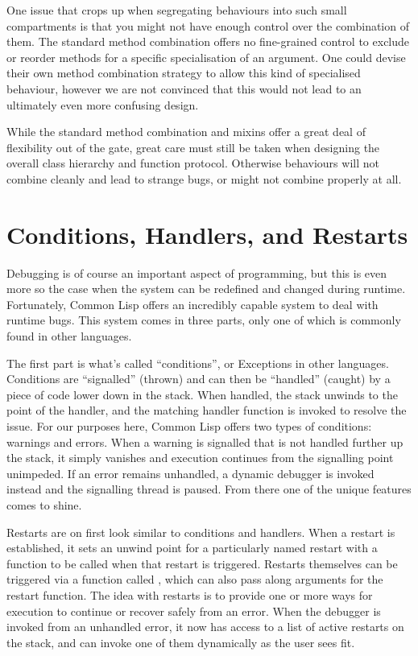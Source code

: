 \documentclass[a4paper]{paper}
\begin{document}
One issue that crops up when segregating behaviours into such small compartments is that you might not have enough control over the combination of them. The standard method combination offers no fine-grained control to exclude or reorder methods for a specific specialisation of an argument. One could devise their own method combination strategy to allow this kind of specialised behaviour, however we are not convinced that this would not lead to an ultimately even more confusing design.

While the standard method combination and mixins offer a great deal of flexibility out of the gate, great care must still be taken when designing the overall class hierarchy and function protocol. Otherwise behaviours will not combine cleanly and lead to strange bugs, or might not combine properly at all.

\section{Conditions, Handlers, and Restarts}
Debugging is of course an important aspect of programming, but this is even more so the case when the system can be redefined and changed during runtime. Fortunately, Common Lisp offers an incredibly capable system to deal with runtime bugs. This system comes in three parts, only one of which is commonly found in other languages.

The first part is what's called ``conditions'', or Exceptions in other languages. Conditions are ``signalled'' (thrown) and can then be ``handled'' (caught) by a piece of code lower down in the stack. When handled, the stack unwinds to the point of the handler, and the matching handler function is invoked to resolve the issue. For our purposes here, Common Lisp offers two types of conditions: warnings and errors. When a warning is signalled that is not handled further up the stack, it simply vanishes and execution continues from the signalling point unimpeded. If an error remains unhandled, a dynamic debugger is invoked instead and the signalling thread is paused. From there one of the unique features comes to shine.

Restarts are on first look similar to conditions and handlers. When a restart is established, it sets an unwind point for a particularly named restart with a function to be called when that restart is triggered. Restarts themselves can be triggered via a function called , which can also pass along arguments for the restart function. The idea with restarts is to provide one or more ways for execution to continue or recover safely from an error. When the debugger is invoked from an unhandled error, it now has access to a list of active restarts on the stack, and can invoke one of them dynamically as the user sees fit.
\end{document}
